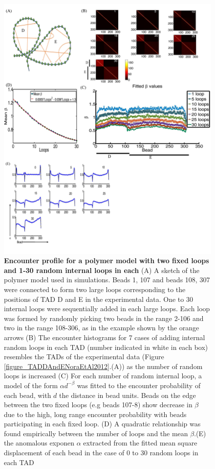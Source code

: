 \documentclass[12pt]{article}
\begin{document}
\begin{figure}[H]
\includegraphics[scale=0.7]{Figure04_TwoTADs0To30RandomLoops307Beads}
\caption{\textbf{Encounter profile for a polymer model with two fixed loops and 1-30 random internal loops in each} (A) A sketch of the polymer model used in simulations. Beads 1, 107 and beads 108, 307 were connected to form two large loops corresponding to the positions of TAD D and E in the experimental data. One to 30 internal loops were sequentially added in each large loops. Each loop was formed by randomly picking two beads in the range 2-106 and two in the range 108-306, as in the example shown by the orange arrows (B) The encounter histograms for 7 cases of adding internal random loops in each TAD (number indicated in white in each box) resembles the TADs of the experimental data (Figure \ref{figure_TADDAndENoraEtAl2012}.(A)) as the number of random loops is increased (C) For each number of random internal loop, a model of the form $\alpha d^{-\beta}$ was fitted to the encounter probability of each bead, with $d$ the distance in bead units. Beads on the edge between the two fixed loops (e.g beads 107-8) show decrease in $\beta$ due to the high, long range encounter probability with beads participating in each fixed loop. (D) A quadratic relationship was found empirically between the number of loops and the mean $\beta$.(E) the anomalous exponen $\alpha$ extracted from the fitted mean square displacement of each bead in the case of 0 to 30 random loops in each TAD}
\label{figure_encounterProfileTwoTADs}
\end{figure}
\end{document}
